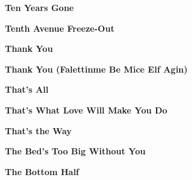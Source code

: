\vspace{10pt} 
\begin{center}\textbf{Ten Years Gone}\end{center}
\newline
\vspace{10pt} 
\begin{center}\textbf{Tenth Avenue Freeze-Out}\end{center}
\newline
\vspace{10pt} 
\begin{center}\textbf{Thank You}\end{center}
\newline
\vspace{10pt} 
\begin{center}\textbf{Thank You (Falettinme Be Mice Elf Agin)}\end{center}
\newline
\vspace{10pt} 
\begin{center}\textbf{That's All}\end{center}
\newline
\vspace{10pt} 
\begin{center}\textbf{That's What Love Will Make You Do}\end{center}
\newline
\vspace{10pt} 
\begin{center}\textbf{That's the Way}\end{center}
\newline
\vspace{10pt} 
\begin{center}\textbf{The Bed's Too Big Without You}\end{center}
\newline
\vspace{10pt} 
\begin{center}\textbf{The Bottom Half}\end{center}
\newline
\vspace{10pt} 
